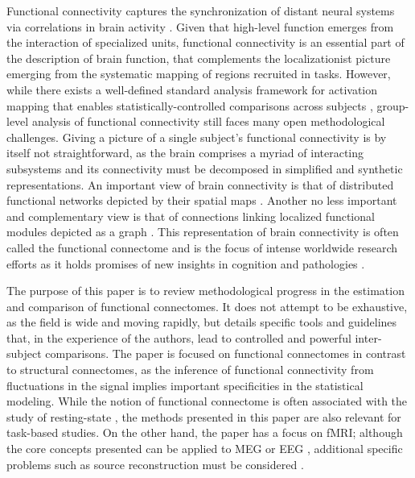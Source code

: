 \documentclass[5p]{elsarticle}
\begin{document}
Functional connectivity captures the synchronization of distant
neural systems via correlations in brain activity
\cite{biswal1995,cordes2000}. Given that high-level
function emerges from the interaction of specialized units, functional
connectivity is an essential part of the description of brain function,
that complements the localizationist picture emerging from the systematic
mapping of regions recruited in tasks. However, while there exists a
well-defined standard analysis framework for activation mapping that enables
statistically-controlled comparisons across subjects \cite{friston1995},
group-level analysis of functional connectivity still faces many open
methodological challenges. Giving a picture of a single subject's 
functional connectivity is by itself not straightforward, as the brain
comprises a myriad of interacting subsystems and its connectivity must 
be decomposed in
simplified and synthetic representations. An important view of brain
connectivity is that of distributed functional networks depicted by their
spatial maps \cite{fox2005}. Another no less important and complementary
view is that of connections linking localized functional modules depicted
as a graph \cite{bullmore2009}. This representation of brain connectivity
is often called the functional connectome \cite{sporns2005} and is the
focus of intense worldwide research efforts as it holds promises of new
insights in cognition and pathologies
\cite{greicius2008b,biswal2010,fox2010}.

The purpose of this paper is to review methodological progress in the
estimation and comparison of functional connectomes. It does not attempt
to be exhaustive, as the field is wide and moving rapidly, but details
specific tools and guidelines that, in the experience of the authors,
lead to controlled and powerful inter-subject comparisons. The paper is
focused on functional connectomes in contrast to structural connectomes,
as the inference of functional connectivity from fluctuations in the
signal implies important specificities in the statistical modeling. While 
the notion of functional
connectome is often associated with the study of resting-state
\cite{biswal2010}, the methods presented in this paper are also relevant
for task-based studies. On the other hand, the paper has a focus on fMRI;
although the core concepts presented can be applied to MEG or EEG
\cite{stam2004}, additional specific problems such as source
reconstruction must be considered \cite{schoffelen2009}.
\end{document}
